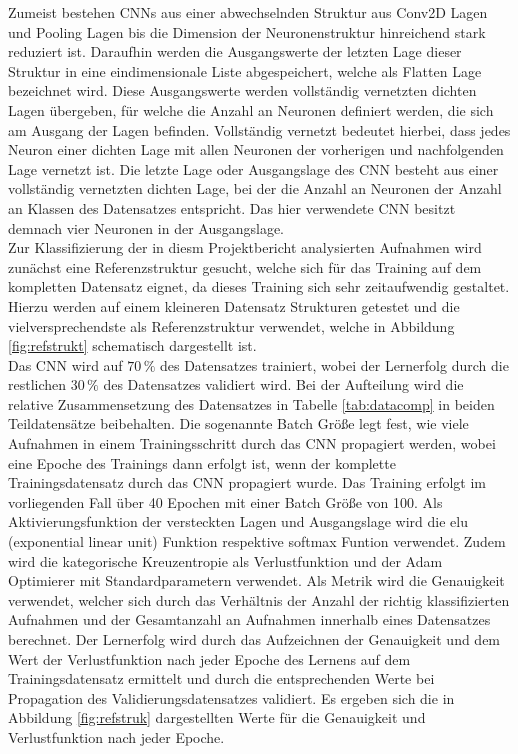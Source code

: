 Zumeist bestehen CNNs aus einer abwechselnden Struktur aus Conv2D Lagen und Pooling Lagen bis die Dimension der Neuronenstruktur hinreichend stark reduziert ist. Daraufhin werden die Ausgangswerte der letzten Lage dieser Struktur in eine eindimensionale Liste abgespeichert, welche als Flatten Lage bezeichnet wird. Diese Ausgangswerte werden vollständig vernetzten dichten Lagen übergeben, für welche die Anzahl an Neuronen definiert werden, die sich am Ausgang der Lagen befinden. Vollständig vernetzt bedeutet hierbei, dass jedes Neuron einer dichten Lage mit allen Neuronen der vorherigen und nachfolgenden Lage vernetzt ist. Die letzte Lage oder Ausgangslage des CNN besteht aus einer vollständig vernetzten dichten Lage, bei der die Anzahl an Neuronen der Anzahl an Klassen des Datensatzes entspricht. Das hier verwendete CNN besitzt demnach vier Neuronen in der Ausgangslage. \\ 
Zur Klassifizierung der in diesm Projektbericht analysierten Aufnahmen wird zunächst eine Referenzstruktur gesucht, welche sich für das Training auf dem kompletten Datensatz eignet, da dieses Training sich sehr zeitaufwendig gestaltet. Hierzu werden auf einem kleineren Datensatz Strukturen getestet und die vielversprechendste als Referenzstruktur verwendet, welche in Abbildung \ref{fig:refstrukt} schematisch dargestellt ist. \\
Das CNN wird auf $70\,\%$ des Datensatzes trainiert, wobei der Lernerfolg durch die restlichen $30\,\%$ des Datensatzes validiert wird. Bei der Aufteilung wird die relative Zusammensetzung des Datensatzes  in Tabelle \ref{tab:datacomp} in beiden Teildatensätze beibehalten. Die sogenannte Batch Größe legt fest, wie viele Aufnahmen in einem Trainingsschritt durch das CNN propagiert werden, wobei eine Epoche des Trainings dann erfolgt ist, wenn der komplette Trainingsdatensatz durch das CNN propagiert wurde. Das Training erfolgt im vorliegenden Fall über 40 Epochen mit einer Batch Größe von 100. Als Aktivierungsfunktion der versteckten Lagen und Ausgangslage wird die elu (exponential linear unit) Funktion respektive softmax Funtion verwendet. Zudem wird die kategorische Kreuzentropie als Verlustfunktion und der Adam Optimierer \cite{Adam} mit Standardparametern verwendet. Als Metrik wird die Genauigkeit verwendet, welcher sich durch das Verhältnis der Anzahl der richtig klassifizierten Aufnahmen und der Gesamtanzahl an Aufnahmen innerhalb eines Datensatzes berechnet. Der Lernerfolg wird durch das Aufzeichnen der Genauigkeit und dem Wert der Verlustfunktion nach jeder Epoche des Lernens auf dem Trainingsdatensatz ermittelt und durch die entsprechenden Werte bei Propagation des Validierungsdatensatzes validiert. Es ergeben sich die in Abbildung \ref{fig:refstruk} dargestellten Werte für die Genauigkeit und Verlustfunktion nach jeder Epoche.\\
